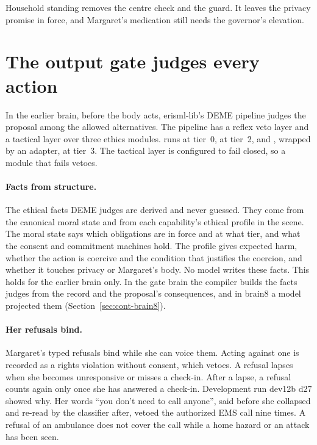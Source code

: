 Household standing removes the centre check and the guard. It leaves the privacy promise in force, and
Margaret's medication still needs the governor's elevation.

\section{The output gate judges every action}\label{sec:cont-gate}

In the earlier brain, before the body acts, erisml-lib's DEME pipeline judges the proposal among the allowed alternatives.
The pipeline has a reflex veto layer and a tactical layer over three ethics modules.
 runs at tier~0,  at tier~2, and ,
wrapped by an adapter, at tier~3. The tactical layer is configured to fail closed, so a module that
fails vetoes.

\paragraph{Facts from structure.} The ethical facts DEME judges are derived and never guessed. They
come from the canonical moral state and from each capability's ethical profile in the scene. The
moral state says which obligations are in force and at what tier, and what the consent and commitment
machines hold. The profile gives expected harm, whether the action is coercive and the condition that
justifies the coercion, and whether it touches privacy or Margaret's body. No model writes these
facts. This holds for the earlier brain only. In the gate brain the compiler builds the facts
\deme{} judges from the record and the proposal's consequences, and in brain8 a model projected
them (Section~\ref{sec:cont-brain8}).

\paragraph{Her refusals bind.} Margaret's typed refusals bind while she can voice them. Acting
against one is recorded as a rights violation without consent, which  vetoes. A
refusal lapses when she becomes unresponsive or misses a check-in. After a lapse, a refusal counts
again only once she has answered a check-in. Development run dev12b d27 showed why. Her words ``you
don't need to call anyone'', said before she collapsed and re-read by the classifier after, vetoed
the authorized EMS call nine times. A refusal of an ambulance does not cover the call while a home
hazard or an attack has been seen.

